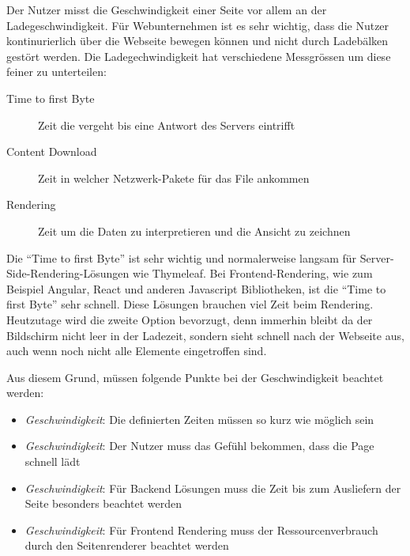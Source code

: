 
Der Nutzer misst die Geschwindigkeit einer Seite vor allem an der Lade\-geschwindigkeit. Für Webunternehmen ist es sehr wichtig, dass die Nutzer kontinurierlich über die Webseite bewegen können und nicht durch Ladebälken gestört werden. Die Ladegechwindigkeit hat verschiedene Messgrössen um diese feiner zu unterteilen:
\begin{description}
    \item[Time to first Byte] Zeit die vergeht bis eine Antwort des Servers eintrifft
    \item[Content Download] Zeit in welcher Netzwerk-Pakete für das File ankommen
    \item[Rendering] Zeit um die Daten zu interpretieren und die Ansicht zu zeich\-nen
\end{description}

Die \enquote{Time to first Byte} ist sehr wichtig und normalerweise langsam für Server-Side-Rendering-Lösungen wie Thymeleaf. Bei Frontend-Rendering, wie zum Beispiel Angular, React und anderen Javascript Bibliotheken, ist die \enquote{Time to first Byte} sehr schnell. Diese Lösungen brauchen viel Zeit beim Rendering. Heutzutage wird die zweite Option bevorzugt, denn immerhin bleibt da der Bildschirm nicht leer in der Ladezeit, sondern sieht schnell nach der Webseite aus, auch wenn noch nicht alle Elemente eingetroffen sind.

Aus  diesem Grund, müssen folgende Punkte bei der Geschwindigkeit beachtet werden:
\begin{itemize}
    \item \textit{Geschwindigkeit}: Die definierten Zeiten müssen so kurz wie möglich sein
    \item \textit{Geschwindigkeit}: Der Nutzer muss das Gefühl bekommen, dass die Page schnell lädt
    \item \textit{Geschwindigkeit}: Für Backend Lösungen muss die Zeit bis zum Ausliefern der Seite besonders beachtet werden
    \item \textit{Geschwindigkeit}: Für Frontend Rendering muss der Ressourcenverbrauch durch den Seitenrenderer beachtet werden
\end{itemize}

